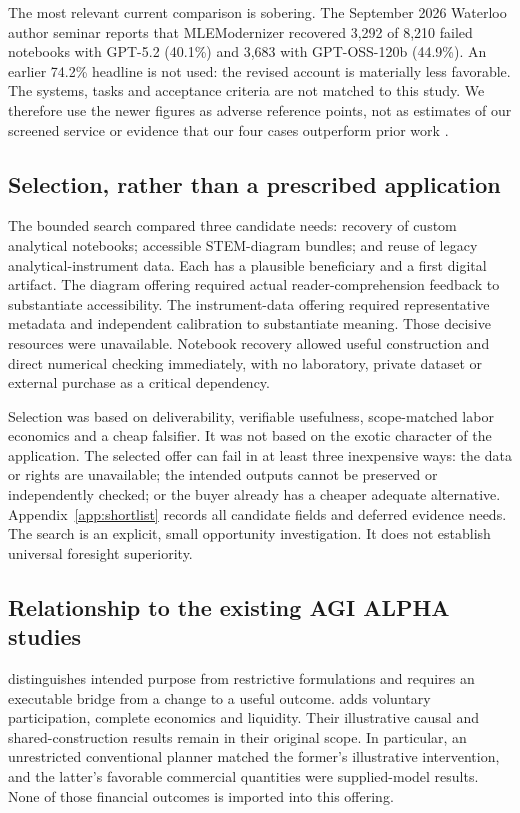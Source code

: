 The most relevant current comparison is sobering. The September 2026 Waterloo author seminar reports that MLEModernizer recovered 3,292 of 8,210 failed notebooks with GPT-5.2 (40.1\%) and 3,683 with GPT-OSS-120b (44.9\%). An earlier 74.2\% headline is not used: the revised account is materially less favorable. The systems, tasks and acceptance criteria are not matched to this study. We therefore use the newer figures as adverse reference points, not as estimates of our screened service or evidence that our four cases outperform prior work \citep{modernizer2026}.

\subsection{Selection, rather than a prescribed application}
The bounded search compared three candidate needs: recovery of custom analytical notebooks; accessible STEM-diagram bundles; and reuse of legacy analytical-instrument data. Each has a plausible beneficiary and a first digital artifact. The diagram offering required actual reader-comprehension feedback to substantiate accessibility. The instrument-data offering required representative metadata and independent calibration to substantiate meaning. Those decisive resources were unavailable. Notebook recovery allowed useful construction and direct numerical checking immediately, with no laboratory, private dataset or external purchase as a critical dependency.

Selection was based on deliverability, verifiable usefulness, scope-matched labor economics and a cheap falsifier. It was not based on the exotic character of the application. The selected offer can fail in at least three inexpensive ways: the data or rights are unavailable; the intended outputs cannot be preserved or independently checked; or the buyer already has a cheaper adequate alternative. Appendix~\ref{app:shortlist} records all candidate fields and deferred evidence needs. The search is an explicit, small opportunity investigation. It does not establish universal foresight superiority.

\subsection{Relationship to the existing AGI ALPHA studies}
\citet{transformational} distinguishes intended purpose from restrictive formulations and requires an executable bridge from a change to a useful outcome. \citet{economy} adds voluntary participation, complete economics and liquidity. Their illustrative causal and shared-construction results remain in their original scope. In particular, an unrestricted conventional planner matched the former's illustrative intervention, and the latter's favorable commercial quantities were supplied-model results. None of those financial outcomes is imported into this offering.

